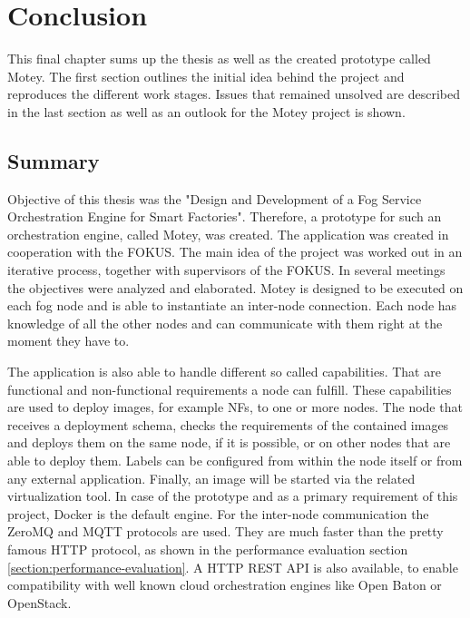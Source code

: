 \chapter{Conclusion}
\label{chapter:conclusion}
\minitoc\vspace{.5cm}
This final chapter sums up the thesis as well as the created prototype called Motey.
The first section outlines the initial idea behind the project and reproduces the different work stages.
Issues that remained unsolved are described in the last section as well as an outlook for the Motey project is shown.

\section{Summary}
Objective of this thesis was the "Design and Development of a Fog Service Orchestration Engine for Smart Factories".
Therefore, a prototype for such an orchestration engine, called Motey, was created.
The application was created in cooperation with the \ac{FOKUS}.
The main idea of the project was worked out in an iterative process, together with supervisors of the \ac{FOKUS}.
In several meetings the objectives were analyzed and elaborated.
Motey is designed to be executed on each fog node and is able to instantiate an inter-node connection.
Each node has knowledge of all the other nodes and can communicate with them right at the moment they have to.\newline

The application is also able to handle different so called capabilities.
That are functional and non-functional requirements a node can fulfill.
These capabilities are used to deploy images, for example \acp{NF}, to one or more nodes.
The node that receives a deployment schema, checks the requirements of the contained images and deploys them on the same node, if it is possible, or on other nodes that are able to deploy them.
Labels can be configured from within the node itself or from any external application.
Finally, an image will be started via the related virtualization tool.
In case of the prototype and as a primary requirement of this project, Docker is the default engine.
For the inter-node communication the ZeroMQ and \ac{MQTT} protocols are used.
They are much faster than the pretty famous \ac{HTTP} protocol, as shown in the performance evaluation section \ref{section:performance-evaluation}.
A \ac{HTTP} \ac{REST} \ac{API} is also available, to enable compatibility with well known cloud orchestration engines like Open Baton or OpenStack.

